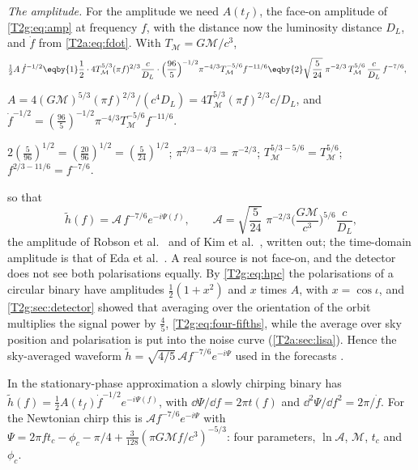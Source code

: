 \emph{The amplitude.} For the amplitude we need $A(t_f)$, the face-on amplitude of \eqref{T2g:eq:amp} at frequency $f$, with the distance now the luminosity distance $D_L$, and $\dot f$ from \eqref{T2a:eq:fdot}. With $T_{\mathcal M}=G\mathcal M/c^3$,
\begin{align}
  \tfrac12A\,\dot f^{-1/2}
  &\eqby{1}\frac12\cdot4T_{\mathcal M}^{5/3}(\pi f)^{2/3}\frac{c}{D_L}\cdot\Big(\frac{96}{5}\Big)^{-1/2}\pi^{-4/3}T_{\mathcal M}^{-5/6}f^{-11/6}
  \eqby{2}\sqrt{\frac{5}{24}}\;\pi^{-2/3}\,T_{\mathcal M}^{5/6}\,\frac{c}{D_L}\,f^{-7/6},
\end{align}
\begin{explain}
  \item $A=4(G\mathcal M)^{5/3}(\pi f)^{2/3}/(c^4D_L)=4T_{\mathcal M}^{5/3}(\pi f)^{2/3}c/D_L$, and $\dot f^{-1/2}=(\tfrac{96}5)^{-1/2}\pi^{-4/3}T_{\mathcal M}^{-5/6}f^{-11/6}$.
  \item $2(\tfrac{5}{96})^{1/2}=(\tfrac{20}{96})^{1/2}=(\tfrac5{24})^{1/2}$; $\pi^{2/3-4/3}=\pi^{-2/3}$; $T_{\mathcal M}^{5/3-5/6}=T_{\mathcal M}^{5/6}$; $f^{2/3-11/6}=f^{-7/6}$.
\end{explain}
so that
\begin{equation}
  \tilde h(f)=\mathcal A\,f^{-7/6}e^{-i\Psi(f)},\qquad
  \mathcal A=\sqrt{\frac{5}{24}}\;\pi^{-2/3}\Big(\frac{G\mathcal M}{c^3}\Big)^{5/6}\frac{c}{D_L},
  \label{T2a:eq:hf}
\end{equation}
the amplitude of Robson et al.\ \cite[eq.~(20)]{Robson2019} and of Kim et al.\ \cite[eq.~(45)]{Kim2023}, written out; the time-domain amplitude is that of Eda et al.\ \cite[eq.~(21)]{Eda2015}. A real source is not face-on, and the detector does not see both polarisations equally. By \eqref{T2g:eq:hpc} the polarisations of a circular binary have amplitudes $\tfrac12(1+x^2)$ and $x$ times $A$, with $x=\cos\iota$, and \cref{T2g:sec:detector} showed that averaging over the orientation of the orbit multiplies the signal power by $\tfrac45$, \eqref{T2g:eq:four-fifths}, while the average over sky position and polarisation is put into the noise curve (\cref{T2a:sec:lisa}). Hence the sky-averaged waveform $\tilde h=\sqrt{4/5}\,\mathcal A f^{-7/6}e^{-i\Psi}$ used in the forecasts \cite[eq.~(44)]{Kim2023}.

\begin{keyidea}
In the stationary-phase approximation a slowly chirping binary has $\tilde h(f)=\tfrac12A(t_f)\dot f^{-1/2}e^{-i\Psi(f)}$, with $\dd\Psi/\dd f=2\pi t(f)$ and $\dd^2\Psi/\dd f^2=2\pi/\dot f$. For the Newtonian chirp this is $\mathcal A f^{-7/6}e^{-i\Psi}$ with $\Psi=2\pi ft_c-\phi_c-\pi/4+\tfrac{3}{128}(\pi G\mathcal Mf/c^3)^{-5/3}$: four parameters, $\ln\mathcal A$, $\mathcal M$, $t_c$ and $\phi_c$.
\end{keyidea}

